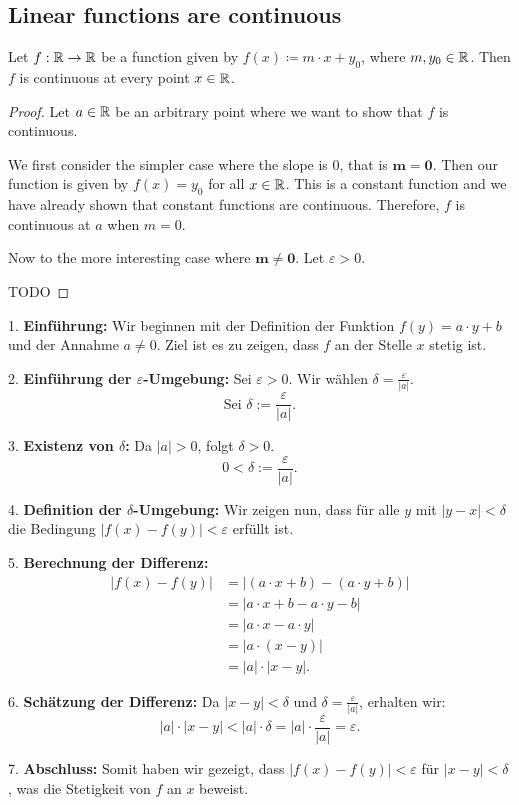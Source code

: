 \subsection{Linear functions are continuous}

\begin{theorem}
   Let $f: \mathbb{R} \to \mathbb{R}$ be a function given by $f(x) \coloneqq m \cdot x + y_0$, where $m, y_0 \in \mathbb{R}$. Then $f$ is continuous at every point $x \in \mathbb{R}$.
\end{theorem}

\begin{proof}
   Let $a \in \mathbb{R}$ be an arbitrary point where we want to show that $f$ is continuous.

   We first consider the simpler case where the slope is $0$, that is $\mathbf{m = 0}$. Then our function is given by $f(x) = y_0$ for all $x \in \mathbb{R}$. This is a constant function and we have already shown that constant functions are continuous. Therefore, $f$ is continuous at $a$ when $m = 0$.

   Now to the more interesting case where $\mathbf{m \neq 0}$. Let $\varepsilon > 0$.

   TODO
\end{proof}

\vspace{1cm}


1. \textbf{Einführung:}
   Wir beginnen mit der Definition der Funktion $f(y) = a \cdot y + b$ und der Annahme $a \neq 0$. Ziel ist es zu zeigen, dass $f$ an der Stelle $x$ stetig ist. 

2. \textbf{Einführung der $\varepsilon$-Umgebung:}
   Sei $\varepsilon > 0$. Wir wählen $\delta = \frac{\varepsilon}{|a|}$.
   \[
   \text{Sei } \delta := \frac{\varepsilon}{|a|}.
   \]

3. \textbf{Existenz von $\delta$:}
   Da $|a| > 0$, folgt $\delta > 0$.
   \[
   0 < \delta := \frac{\varepsilon}{|a|}.
   \]

4. \textbf{Definition der $\delta$-Umgebung:}
   Wir zeigen nun, dass für alle $y$ mit $|y - x| < \delta$ die Bedingung $|f(x) - f(y)| < \varepsilon$ erfüllt ist. 

5. \textbf{Berechnung der Differenz:}
   \begin{align*}
   |f(x) - f(y)| &= |(a \cdot x + b) - (a \cdot y + b)| \\
   &= |a \cdot x + b - a \cdot y - b| \\
   &= |a \cdot x - a \cdot y| \\
   &= |a \cdot (x - y)| \\
   &= |a| \cdot |x - y|.
   \end{align*}

6. \textbf{Schätzung der Differenz:}
   Da $|x - y| < \delta$ und $\delta = \frac{\varepsilon}{|a|}$, erhalten wir:
   \[
   |a| \cdot |x - y| < |a| \cdot \delta = |a| \cdot \frac{\varepsilon}{|a|} = \varepsilon.
   \]

7. \textbf{Abschluss:}
   Somit haben wir gezeigt, dass $|f(x) - f(y)| < \varepsilon$ für $|x - y| < \delta$, was die Stetigkeit von $f$ an $x$ beweist.
